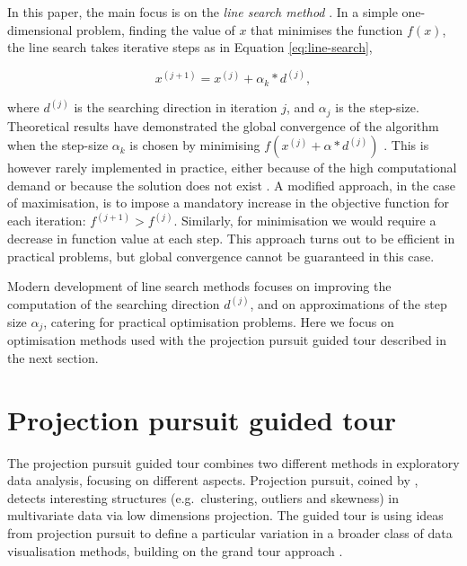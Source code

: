 \documentclass[12pt]{article}
\begin{document}
In this paper, the main focus is on the \emph{line search method} \citep{fletcher2013practical}. In a simple one-dimensional problem, finding the value of \(x\) that minimises the function \(f(x)\), the line search takes iterative steps as in Equation \ref{eq:line-search},

\begin{equation}
x^{(j + 1)} = x^{(j)} + \alpha_k* d^{(j)},
\label{eq:line-search}
\end{equation}

where \(d^{(j)}\) is the searching direction in iteration \(j\), and \(\alpha_j\) is the step-size. Theoretical results have demonstrated the global convergence of the algorithm when the step-size \(\alpha_k\) is chosen by minimising \(f(x^{(j)} + \alpha* d^{(j)})\) \citep{curry1944method}. This is however rarely implemented in practice, either because of the high computational demand or because the solution does not exist \citep{fletcher2013practical}. A modified approach, in the case of maximisation, is to impose a mandatory increase in the objective function for each iteration: \(f^{(j+1)}> f^{(j)}\). Similarly, for minimisation we would require a decrease in function value at each step. This approach turns out to be efficient in practical problems, but global convergence cannot be guaranteed in this case.

Modern development of line search methods focuses on improving the computation of the searching direction \(d^{(j)}\), and on approximations of the step size \(\alpha_j\), catering for practical optimisation problems. Here we focus on optimisation methods used with the projection pursuit guided tour described in the next section.

\hypertarget{tour}{%
\section{Projection pursuit guided tour}\label{tour}}

The projection pursuit guided tour combines two different methods in exploratory data analysis, focusing on different aspects. Projection pursuit, coined by \citet{friedman1974projection}, detects interesting structures (e.g.~clustering, outliers and skewness) in multivariate data via low dimensions projection. The guided tour is using ideas from projection pursuit to define a particular variation in a broader class of data visualisation methods, building on the grand tour approach \citep{As85}.
\end{document}
